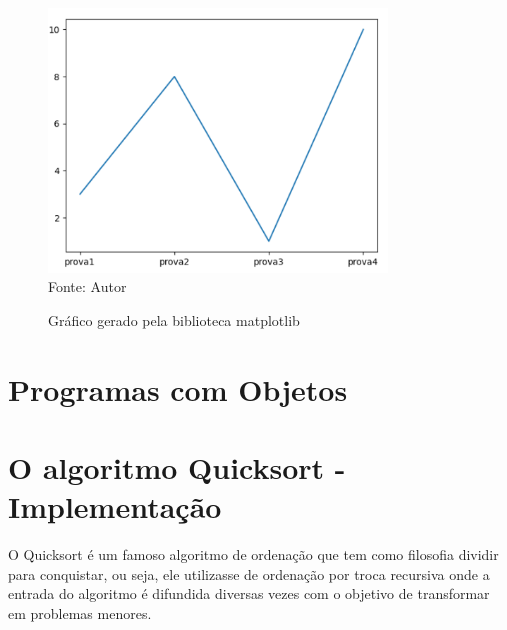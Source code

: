   \begin{figure}[H]
  	\begin{center}
  		\caption{Gráfico gerado pela biblioteca matplotlib} \label{ling1}
  		\includegraphics[width=9cm]{grafico py.PNG} \\
  		{\tiny \sf Fonte:{ Autor}}
  	\end{center}
  \end{figure}
  
    \section{Programas com Objetos}


    \section{O algoritmo Quicksort - Implementa\c{c}\~{a}o}

O Quicksort é um famoso algoritmo de ordenação que tem como filosofia dividir para conquistar, ou seja, ele utilizasse de ordenação por troca recursiva onde a entrada do algoritmo é difundida diversas vezes com o objetivo de transformar em problemas menores.

